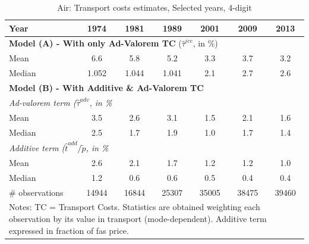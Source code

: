\documentclass[a4paper,11pt]{article}
\begin{document}
\begin{table}[htbp]
  \centering
  \caption{Air: Transport costs estimates, Selected years, 4-digit}
\begin{center}
    \begin{tabular}{l|cccccc}
   \hline\hline
Year & 1974  & 1981  & 1989  & 2001  & 2009  & 2013 \\ \hline
\multicolumn{7}{l}{\textbf{Model (A) - With only Ad-Valorem TC} ($\widehat{\tau}^{ice}$, in \%) }  \\
\hline
Mean  & 6.6 & 5.8 & 5.2 & 3.3 & 3.7 & 3.2 \\
Median & 1.052 & 1.044 & 1.041 & 2.1 & 2.7 & 2.6 \\
\hline
\multicolumn{7}{l}{\textbf{Model (B) - With Additive \& Ad-Valorem TC}}  \\ \hline
\multicolumn{7}{l}{\textit{Ad-valorem term ($\widehat{\tau}^{adv}$, in \%} }   \\ \hline
Mean  & 3.5 & 2.6 & 3.1 & 1.5 & 2.1 & 1.6  \\
Median & 2.5 & 1.7 & 1.9 & 1.0 & 1.7 & 1.4  \\
\hline
\multicolumn{7}{l}{\textit{Additive term ($\widehat{t}^{add}/\widetilde{p}$, in \%} }   \\ \hline
Mean  & 2.6 & 2.1 & 1.7 & 1.2 &1.2 & 1.0 \\
Median & 1.2 & 0.6 & 0.6 & 0.5 & 0.4 & 0.4  \\
\hline
\# observations & 14944 & 16844 & 25307 & \multicolumn{1}{c}{35005} & \multicolumn{1}{c}{38475} & \multicolumn{1}{c}{39460}  \\
\hline\hline
\multicolumn{7}{l}{\parbox[l]{11cm}{ \vspace{7pt}\scriptsize{Notes: TC = Transport Costs. Statistics are obtained weighting each observation by its value in transport (mode-dependent). Additive term expressed in fraction of fas price.}}}
\end{tabular}%
\end{center}
  \label{tab:result_air_rob}
\end{table}%
\end{document}
